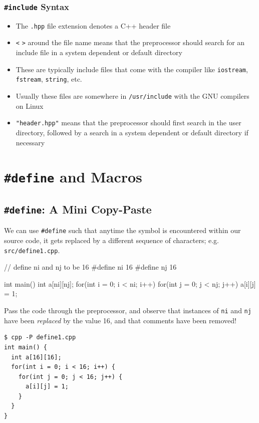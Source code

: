 \documentclass[12pt,letterpaper,twoside]{article}
\begin{document}
\subsubsection{\texttt{\#include} Syntax}
\begin{itemize}
\item
  The \texttt{.hpp} file extension denotes a C++ header file
\item
  \texttt{\textless{}} \texttt{\textgreater{}} around the file name
  means that the preprocessor should search for an include file in a
  system dependent or default directory
\item
  These are typically include files that come with the compiler like
  \texttt{iostream}, \texttt{fstream}, \texttt{string}, etc.
\item
  Usually these files are somewhere in \texttt{/usr/include} with the
  GNU compilers on Linux
\item
  \texttt{"header.hpp"} means that the preprocessor should first search
  in the user directory, followed by a search in a system dependent or
  default directory if necessary
\end{itemize}

\section{\texttt{\#define} and Macros}
\subsection{\texttt{\#define}: A Mini Copy-Paste}
We can use \texttt{\#define} such that anytime the symbol is encountered within our
source code, it gets replaced by a different sequence of characters; e.g.
\texttt{src/define1.cpp}.

\begin{cpp}
// define ni and nj to be 16
#define ni 16
#define nj 16

int main() {
  int a[ni][nj];
  for(int i = 0; i < ni; i++) {
    for(int j = 0; j < nj; j++) {
      a[i][j] = 1;
    }
  }
}
\end{cpp}

Pass the code through the preprocessor, and observe that instances of \texttt{ni} and 
\texttt{nj} have been \emph{replaced} by the value 16, and that comments have been removed!

\begin{verbatim}
$ cpp -P define1.cpp
int main() {
  int a[16][16];
  for(int i = 0; i < 16; i++) {
    for(int j = 0; j < 16; j++) {
      a[i][j] = 1;
    }
  }
}
\end{verbatim}
\end{document}
